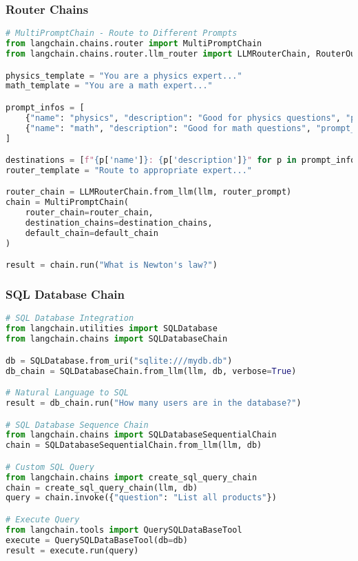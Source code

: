 \begin{frame}[fragile]\frametitle{Router Chains}
\begin{lstlisting}[language=python,basicstyle=\tiny]
# MultiPromptChain - Route to Different Prompts
from langchain.chains.router import MultiPromptChain
from langchain.chains.router.llm_router import LLMRouterChain, RouterOutputParser

physics_template = "You are a physics expert..."
math_template = "You are a math expert..."

prompt_infos = [
    {"name": "physics", "description": "Good for physics questions", "prompt_template": physics_template},
    {"name": "math", "description": "Good for math questions", "prompt_template": math_template}
]

destinations = [f"{p['name']}: {p['description']}" for p in prompt_infos]
router_template = "Route to appropriate expert..."

router_chain = LLMRouterChain.from_llm(llm, router_prompt)
chain = MultiPromptChain(
    router_chain=router_chain,
    destination_chains=destination_chains,
    default_chain=default_chain
)

result = chain.run("What is Newton's law?")
\end{lstlisting}
\end{frame}

\begin{frame}[fragile]\frametitle{SQL Database Chain}
\begin{lstlisting}[language=python,basicstyle=\tiny]
# SQL Database Integration
from langchain.utilities import SQLDatabase
from langchain.chains import SQLDatabaseChain

db = SQLDatabase.from_uri("sqlite:///mydb.db")
db_chain = SQLDatabaseChain.from_llm(llm, db, verbose=True)

# Natural Language to SQL
result = db_chain.run("How many users are in the database?")

# SQL Database Sequence Chain
from langchain.chains import SQLDatabaseSequentialChain
chain = SQLDatabaseSequentialChain.from_llm(llm, db)

# Custom SQL Query
from langchain.chains import create_sql_query_chain
chain = create_sql_query_chain(llm, db)
query = chain.invoke({"question": "List all products"})

# Execute Query
from langchain.tools import QuerySQLDataBaseTool
execute = QuerySQLDataBaseTool(db=db)
result = execute.run(query)
\end{lstlisting}
\end{frame}

